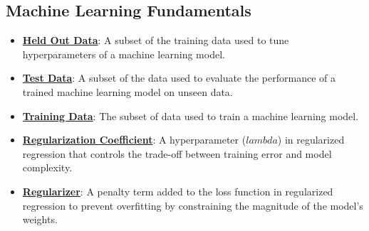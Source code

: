 \documentclass{article}%
\begin{document}
\subsection{Machine Learning Fundamentals}%
\label{subsec:MachineLearningFundamentals}%
\begin{itemize}[leftmargin=*]%
\item \href{https://purdue.brightspace.com/d2l/common/assets/pdfjs-d2l-dist/1.0.14-legacy/web/viewer.html?file=\%2Fcontent\%2Fenforced\%2F1095467-wl.202510.CS.24300.001\%2F10L1-CrossValidation.pdf\%3Fou\%3D1095467\&lang=en-us\&container=d2l-fileviewer-rendered-pdf\&fullscreen=d2l-fileviewer-rendered-pdf-dialog\&height=667#page=6}{\textbf{Held Out Data}}: A subset of the training data used to tune hyperparameters of a machine learning model.%
\item \href{https://purdue.brightspace.com/d2l/common/assets/pdfjs-d2l-dist/1.0.14-legacy/web/viewer.html?file=\%2Fcontent\%2Fenforced\%2F1095467-wl.202510.CS.24300.001\%2F10L1-CrossValidation.pdf\%3Fou\%3D1095467\&lang=en-us\&container=d2l-fileviewer-rendered-pdf\&fullscreen=d2l-fileviewer-rendered-pdf-dialog\&height=667#page=6}{\textbf{Test Data}}: A subset of the data used to evaluate the performance of a trained machine learning model on unseen data.%
\item \href{https://purdue.brightspace.com/d2l/common/assets/pdfjs-d2l-dist/1.0.14-legacy/web/viewer.html?file=\%2Fcontent\%2Fenforced\%2F1095467-wl.202510.CS.24300.001\%2F10L1-CrossValidation.pdf\%3Fou\%3D1095467\&lang=en-us\&container=d2l-fileviewer-rendered-pdf\&fullscreen=d2l-fileviewer-rendered-pdf-dialog\&height=667#page=6}{\textbf{Training Data}}: The subset of data used to train a machine learning model.%
\item \href{https://purdue.brightspace.com/d2l/common/assets/pdfjs-d2l-dist/1.0.14-legacy/web/viewer.html?file=\%2Fcontent\%2Fenforced\%2F1095467-wl.202510.CS.24300.001\%2F10L1-CrossValidation.pdf\%3Fou\%3D1095467\&lang=en-us\&container=d2l-fileviewer-rendered-pdf\&fullscreen=d2l-fileviewer-rendered-pdf-dialog\&height=667#page=17}{\textbf{Regularization Coefficient}}: A hyperparameter ($ lambda$) in regularized regression that controls the trade-off between training error and model complexity.%
\item \href{https://purdue.brightspace.com/d2l/common/assets/pdfjs-d2l-dist/1.0.14-legacy/web/viewer.html?file=\%2Fcontent\%2Fenforced\%2F1095467-wl.202510.CS.24300.001\%2F10L1-CrossValidation.pdf\%3Fou\%3D1095467\&lang=en-us\&container=d2l-fileviewer-rendered-pdf\&fullscreen=d2l-fileviewer-rendered-pdf-dialog\&height=667#page=17}{\textbf{Regularizer}}: A penalty term added to the loss function in regularized regression to prevent overfitting by constraining the magnitude of the model's weights.%

\end{itemize}
\end{document}
